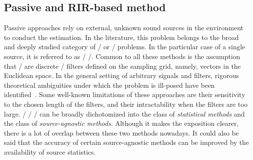 \subsection{Passive and RIR-based method}\label{subsec:estimation:bce}
Passive approaches
 rely on external, unknown sound sources in the environment to conduct the estimation.
In the literature, this problem belongs to the broad and deeply studied category of \BCEdef/ or \BSIdef/ problems.
In the particular case of a single source, it is referred to as \SIMO/ \BCE/.
Common to all these methods is the assumption that \RIRs/ are discrete \FIR/ filters defined on the sampling grid, namely, vectors in the Euclidean space.
In the general setting of arbitrary signals and filters, rigorous theoretical ambiguities under which the problem is ill-posed have been identified~.
Some well-known limitations of these approaches are their sensitivity to the chosen length of the filters, and their intractability when the filters are too large.
\FIR/ \SIMO/ \BCE/ can be broadly dichotomized into the class of \textit{statistical methods} and the class of \textit{source-agnostic methods}.
Although it makes the exposition clearer, there is a lot of overlap between these two methods nowadays.
It could also be said that the accuracy of certain source-agnostic methods can be improved by the availability of source statistics.


